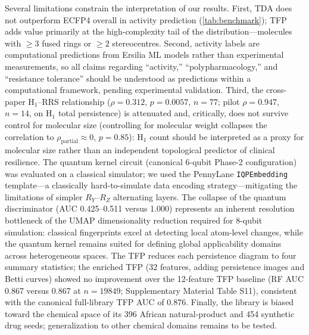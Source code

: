 \documentclass[11pt,a4paper]{article}
\begin{document}
Several limitations constrain the interpretation of our results. First, TDA does not outperform ECFP4 overall in activity prediction (\cref{tab:benchmark}); TFP adds value primarily at the high-complexity tail of the distribution---molecules with $\geq 3$ fused rings or $\geq 2$ stereocentres. Second, activity labels are computational predictions from Ersilia ML models rather than experimental measurements, so all claims regarding ``activity,'' ``polypharmacology,'' and ``resistance tolerance'' should be understood as predictions within a computational framework, pending experimental validation. Third, the cross-paper H$_1$--RRS relationship ($\rho = \num{0.312}$, $p = \num{0.0057}$, $n = \num{77}$; pilot $\rho = \num{0.947}$, $n = \num{14}$, on H$_1$ total persistence) is attenuated and, critically, does not survive control for molecular size (controlling for molecular weight collapses the correlation to $\rho_{\text{partial}} \approx 0$, $p = \num{0.85}$): H$_1$ count should be interpreted as a proxy for molecular size rather than an independent topological predictor of clinical resilience. The quantum kernel circuit (canonical 6-qubit Phase-2 configuration) was evaluated on a classical simulator; we used the PennyLane \texttt{IQPEmbedding} template---a classically hard-to-simulate data encoding strategy---mitigating the limitations of simpler $R_Y$--$R_Z$ alternating layers. The collapse of the quantum discriminator (AUC \numrange{0.425}{0.511} versus \num{1.000}) represents an inherent resolution bottleneck of the UMAP dimensionality reduction required for 8-qubit simulation: classical fingerprints excel at detecting local atom-level changes, while the quantum kernel remains suited for defining global applicability domains across heterogeneous spaces. The TFP reduces each persistence diagram to four summary statistics; the enriched TFP (32 features, adding persistence images and Betti curves) showed no improvement over the 12-feature TFP baseline (RF AUC \num{0.867} versus \num{0.867} at $n = \num{19849}$; Supplementary Material Table S11), consistent with the canonical full-library TFP AUC of \num{0.876}. Finally, the library is biased toward the chemical space of its 396 African natural-product and 454 synthetic drug seeds; generalization to other chemical domains remains to be tested.
\end{document}
